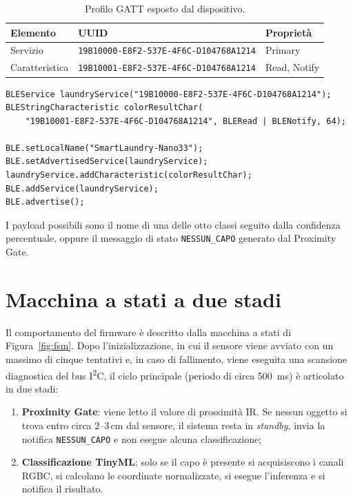 \documentclass[11pt,a4paper,twoside,openany]{report}
\newcommand{\uuid}[1]{\texttt{\small #1}}
\begin{document}
\begin{table}[htbp]
\centering
\caption{Profilo GATT esposto dal dispositivo.}
\label{tab:gatt}
\begin{tabular}{@{}lll@{}}
\toprule
\textbf{Elemento} & \textbf{UUID} & \textbf{Proprietà} \\
\midrule
Servizio        & \uuid{19B10000-E8F2-537E-4F6C-D104768A1214} & Primary \\
Caratteristica  & \uuid{19B10001-E8F2-537E-4F6C-D104768A1214} & Read, Notify \\
\bottomrule
\end{tabular}
\end{table}

\begin{lstlisting}[caption={Definizione del servizio GATT e avvio dell'advertising.}, label={lst:ble}]
BLEService laundryService("19B10000-E8F2-537E-4F6C-D104768A1214");
BLEStringCharacteristic colorResultChar(
    "19B10001-E8F2-537E-4F6C-D104768A1214", BLERead | BLENotify, 64);

BLE.setLocalName("SmartLaundry-Nano33");
BLE.setAdvertisedService(laundryService);
laundryService.addCharacteristic(colorResultChar);
BLE.addService(laundryService);
BLE.advertise();
\end{lstlisting}

I payload possibili sono il nome di una delle otto classi seguito dalla
confidenza percentuale, oppure il messaggio di stato
\texttt{NESSUN\_CAPO} generato dal Proximity Gate.

\section{Macchina a stati a due stadi}
\label{sec:fsm}

Il comportamento del firmware è descritto dalla macchina a stati di
Figura~\ref{fig:fsm}. Dopo l'inizializzazione, in cui il sensore viene
avviato con un massimo di cinque tentativi e, in caso di fallimento,
viene eseguita una scansione diagnostica del bus I\textsuperscript{2}C,
il ciclo principale (periodo di circa \SI{500}{ms}) è articolato in due
stadi:

\begin{enumerate}
  \item \textbf{Proximity Gate}: viene letto il valore di prossimità IR.
        Se nessun oggetto si trova entro circa 2--3\,cm dal sensore, il
        sistema resta in \textit{standby}, invia la notifica
        \texttt{NESSUN\_CAPO} e non esegue alcuna classificazione;
  \item \textbf{Classificazione TinyML}: solo se il capo è presente si
        acquisiscono i canali RGBC, si calcolano le coordinate
        normalizzate, si esegue l'inferenza e si notifica il risultato.
\end{enumerate}
\end{document}
